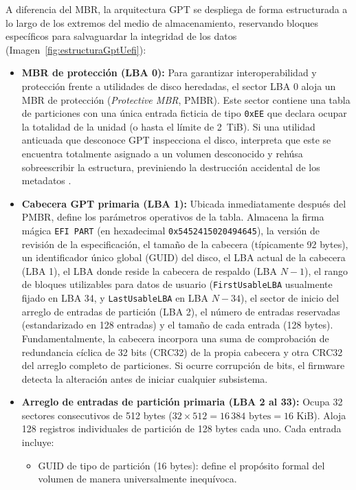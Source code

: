\documentclass[12pt]{article}
\begin{document}
A diferencia del MBR, la arquitectura GPT se despliega de forma estructurada a lo largo de los extremos del medio de almacenamiento, reservando bloques específicos para salvaguardar la integridad de los datos (Imagen~\ref{fig:estructuraGptUefi}):
\begin{itemize}[noitemsep, topsep=2pt]
    \item \textbf{MBR de protección (LBA 0):} Para garantizar interoperabilidad y protección frente a utilidades de disco heredadas, el sector LBA 0 aloja un MBR de protección (\textit{Protective MBR}, PMBR). Este sector contiene una tabla de particiones con una única entrada ficticia de tipo \texttt{0xEE} que declara ocupar la totalidad de la unidad (o hasta el límite de 2~TiB). Si una utilidad anticuada que desconoce GPT inspecciona el disco, interpreta que este se encuentra totalmente asignado a un volumen desconocido y rehúsa sobreescribir la estructura, previniendo la destrucción accidental de los metadatos \parencite{uefi2024specification}.
    \item \textbf{Cabecera GPT primaria (LBA 1):} Ubicada inmediatamente después del PMBR, define los parámetros operativos de la tabla. Almacena la firma mágica \texttt{EFI PART} (en hexadecimal \texttt{0x5452415020494645}), la versión de revisión de la especificación, el tamaño de la cabecera (típicamente 92 bytes), un identificador único global (GUID) del disco, el LBA actual de la cabecera (LBA 1), el LBA donde reside la cabecera de respaldo (LBA $N-1$), el rango de bloques utilizables para datos de usuario (\texttt{FirstUsableLBA} usualmente fijado en LBA 34, y \texttt{LastUsableLBA} en LBA $N-34$), el sector de inicio del arreglo de entradas de partición (LBA 2), el número de entradas reservadas (estandarizado en 128 entradas) y el tamaño de cada entrada (128 bytes). Fundamentalmente, la cabecera incorpora una suma de comprobación de redundancia cíclica de 32 bits (CRC32) de la propia cabecera y otra CRC32 del arreglo completo de particiones. Si ocurre corrupción de bits, el firmware detecta la alteración antes de iniciar cualquier subsistema.
    \item \textbf{Arreglo de entradas de partición primaria (LBA 2 al 33):} Ocupa 32 sectores consecutivos de 512 bytes ($32 \times 512 = 16\,384\text{ bytes} = 16\text{ KiB}$). Aloja 128 registros individuales de partición de 128 bytes cada uno. Cada entrada incluye:
    \begin{itemize}[noitemsep]
        \item GUID de tipo de partición (16 bytes): define el propósito formal del volumen de manera universalmente inequívoca.

\end{itemize}
\end{itemize}
\end{document}
